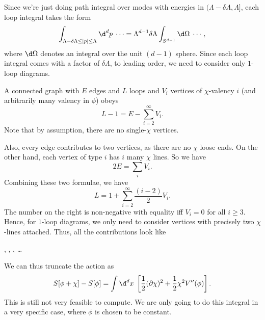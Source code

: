 \documentclass[a4paper]{article}
\begin{document}
Since we're just doing path integral over modes with energies in $(\Lambda - \delta \Lambda, \Lambda]$, each loop integral takes the form
\[
  \int_{\Lambda - \delta \Lambda \leq |p| \leq \Lambda} \d^d p\; \cdots = \Lambda^{d - 1} \delta \Lambda \int_{S^{d - 1}} \d \Omega\; \cdots,
\]
where $\d \Omega$ denotes an integral over the unit $(d - 1)$ sphere. Since each loop integral comes with a factor of $\delta \Lambda$, to leading order, we need to consider only $1$-loop diagrams.

A connected graph with $E$ edges and $L$ loops and $V_i$ vertices of $\chi$-valency $i$ (and arbitrarily many valency in $\phi$) obeys
\[
  L - 1 = E - \sum_{i = 2}^\infty V_i.
\]
Note that by assumption, there are no single-$\chi$ vertices.

Also, every edge contributes to two vertices, as there are no $\chi$ loose ends. On the other hand, each vertex of type $i$ has $i$ many $\chi$ lines. So we have
\[
  2E = \sum_i V_i.
\]
Combining these two formulae, we have
\[
  L = 1 + \sum_{i = 2}^\infty \frac{(i - 2)}{2} V_i.
\]
The number on the right is non-negative with equality iff $V_i = 0$ for all $i \geq 3$. Hence, for $1$-loop diagrams, we only need to consider vertices with precisely two $\chi$-lines attached. Thus, all the contributions look like
\begin{center}
  ,\quad
  ,\quad
  ,\quad
  \ldots
\end{center}
We can thus truncate the action as
\[
  S[\phi + \chi] - S[\phi] = \int \d^d x\;\left[ \frac{1}{2} (\partial \chi)^2 + \frac{1}{2} \chi^2 V''(\phi)\right].
\]
This is still not very feasible to compute. We are only going to do this integral in a very specific case, where $\phi$ is chosen to be constant.
\end{document}
